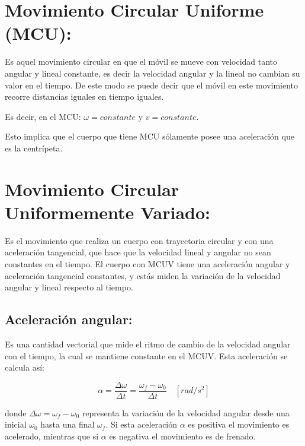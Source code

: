 \documentclass[a5paper,pagesize,10pt,bibtotoc,pointlessnumbers,
normalheadings,DIV=9,fleqn,x11names,table,twoside=false]{scrbook}
\begin{document}
\section{Movimiento Circular Uniforme (MCU):}

Es aquel movimiento circular en que el móvil se mueve con velocidad tanto angular y lineal constante, es decir la velocidad 
angular y la lineal no cambian su valor en el tiempo. De este modo se puede decir que el móvil en este movimiento recorre 
distancias iguales en tiempo iguales. 

\begin{tcolorbox}
Es decir, en el MCU: $\omega = constante$ y $v = constante.$
\end{tcolorbox}

Esto implica que el cuerpo que tiene MCU sólamente posee una aceleración que es la centrípeta.

\section{Movimiento Circular Uniformemente Variado:}

Es el movimiento que realiza un cuerpo con trayectoria circular y con una aceleración tangencial, que hace que la velocidad 
lineal y angular no sean constantes en el tiempo. El cuerpo con MCUV tiene una aceleración angular y aceleración tangencial 
constantes, y estás miden la variación de la velocidad angular y lineal respecto al tiempo.\\

\subsection{Aceleración angular:}

Es una cantidad vectorial que mide el ritmo de cambio de la velocidad angular con el tiempo, la cual se mantiene constante en el 
MCUV. Esta aceleración se calcula así:

\begin{equation}
\alpha = \frac{\Delta \omega}{\Delta t} =  \frac{\omega_f - \omega_0}{\Delta t}\quad [rad/s^2]
\end{equation}
  

donde $\Delta \omega = \omega_f-\omega_0$ representa la variación de la velocidad angular desde una inicial $\omega_0$ hasta una 
final $\omega_f$. Si esta aceleración $\alpha$ es positiva el movimiento es acelerado, mientras que si $\alpha$ es negativa el 
movimiento es de frenado.
\end{document}
